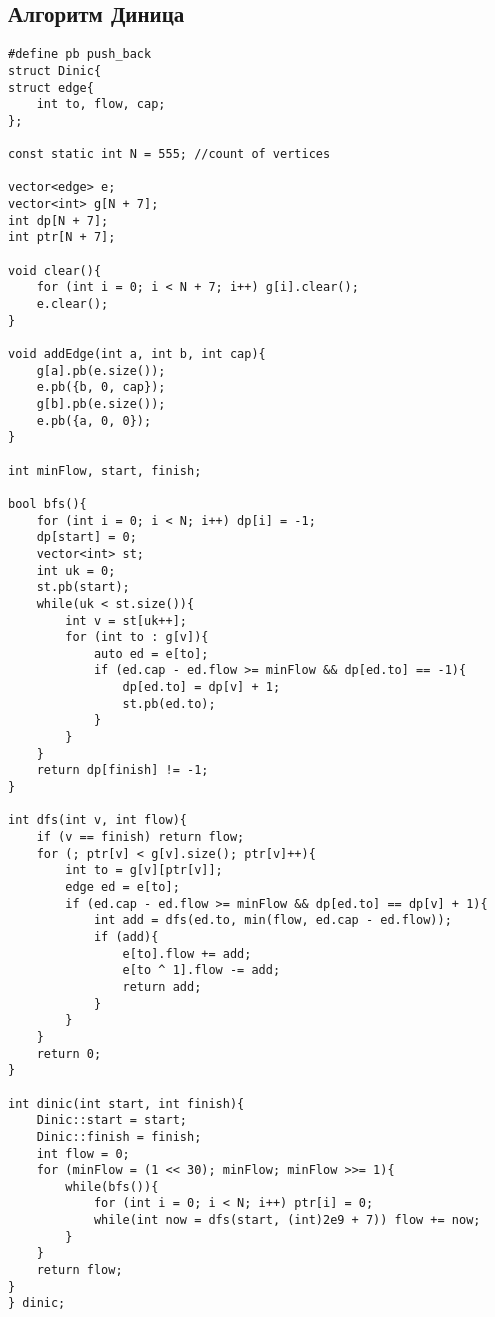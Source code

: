 \subsection{Алгоритм Диница}
\begin{lstlisting}
#define pb push_back
struct Dinic{
struct edge{
    int to, flow, cap;
};

const static int N = 555; //count of vertices

vector<edge> e;
vector<int> g[N + 7];
int dp[N + 7];
int ptr[N + 7];

void clear(){
    for (int i = 0; i < N + 7; i++) g[i].clear();
    e.clear();
}

void addEdge(int a, int b, int cap){
    g[a].pb(e.size());
    e.pb({b, 0, cap});
    g[b].pb(e.size());
    e.pb({a, 0, 0});
}

int minFlow, start, finish;

bool bfs(){
    for (int i = 0; i < N; i++) dp[i] = -1;
    dp[start] = 0;
    vector<int> st;
    int uk = 0;
    st.pb(start);
    while(uk < st.size()){
        int v = st[uk++];
        for (int to : g[v]){
            auto ed = e[to];
            if (ed.cap - ed.flow >= minFlow && dp[ed.to] == -1){
                dp[ed.to] = dp[v] + 1;
                st.pb(ed.to);
            }
        }
    }
    return dp[finish] != -1;
}

int dfs(int v, int flow){
    if (v == finish) return flow;
    for (; ptr[v] < g[v].size(); ptr[v]++){
        int to = g[v][ptr[v]];
        edge ed = e[to];
        if (ed.cap - ed.flow >= minFlow && dp[ed.to] == dp[v] + 1){
            int add = dfs(ed.to, min(flow, ed.cap - ed.flow));
            if (add){
                e[to].flow += add;
                e[to ^ 1].flow -= add;
                return add;
            }
        }
    }
    return 0;
}

int dinic(int start, int finish){
    Dinic::start = start;
    Dinic::finish = finish;
    int flow = 0;
    for (minFlow = (1 << 30); minFlow; minFlow >>= 1){
        while(bfs()){
            for (int i = 0; i < N; i++) ptr[i] = 0;
            while(int now = dfs(start, (int)2e9 + 7)) flow += now;
        }
    }
    return flow;
}
} dinic;
\end{lstlisting}
